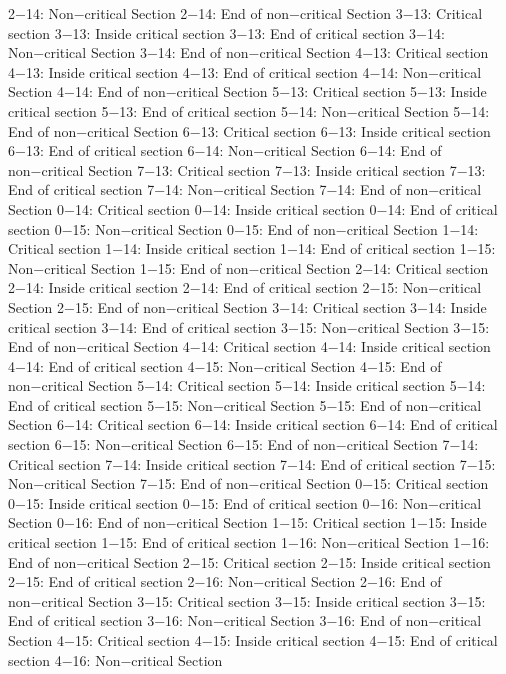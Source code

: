 2−14: Non−critical Section
2−14: End of non−critical Section
3−13: Critical section
3−13: Inside critical section
3−13: End of critical section
3−14: Non−critical Section
3−14: End of non−critical Section
4−13: Critical section
4−13: Inside critical section
4−13: End of critical section
4−14: Non−critical Section
4−14: End of non−critical Section
5−13: Critical section
5−13: Inside critical section
5−13: End of critical section
5−14: Non−critical Section
5−14: End of non−critical Section
6−13: Critical section
6−13: Inside critical section
6−13: End of critical section
6−14: Non−critical Section
6−14: End of non−critical Section
7−13: Critical section
7−13: Inside critical section
7−13: End of critical section
7−14: Non−critical Section
7−14: End of non−critical Section
0−14: Critical section
0−14: Inside critical section
0−14: End of critical section
0−15: Non−critical Section
0−15: End of non−critical Section
1−14: Critical section
1−14: Inside critical section
1−14: End of critical section
1−15: Non−critical Section
1−15: End of non−critical Section
2−14: Critical section
2−14: Inside critical section
2−14: End of critical section
2−15: Non−critical Section
2−15: End of non−critical Section
3−14: Critical section
3−14: Inside critical section
3−14: End of critical section
3−15: Non−critical Section
3−15: End of non−critical Section
4−14: Critical section
4−14: Inside critical section
4−14: End of critical section
4−15: Non−critical Section
4−15: End of non−critical Section
5−14: Critical section
5−14: Inside critical section
5−14: End of critical section
5−15: Non−critical Section
5−15: End of non−critical Section
6−14: Critical section
6−14: Inside critical section
6−14: End of critical section
6−15: Non−critical Section
6−15: End of non−critical Section
7−14: Critical section
7−14: Inside critical section
7−14: End of critical section
7−15: Non−critical Section
7−15: End of non−critical Section
0−15: Critical section
0−15: Inside critical section
0−15: End of critical section
0−16: Non−critical Section
0−16: End of non−critical Section
1−15: Critical section
1−15: Inside critical section
1−15: End of critical section
1−16: Non−critical Section
1−16: End of non−critical Section
2−15: Critical section
2−15: Inside critical section
2−15: End of critical section
2−16: Non−critical Section
2−16: End of non−critical Section
3−15: Critical section
3−15: Inside critical section
3−15: End of critical section
3−16: Non−critical Section
3−16: End of non−critical Section
4−15: Critical section
4−15: Inside critical section
4−15: End of critical section
4−16: Non−critical Section

